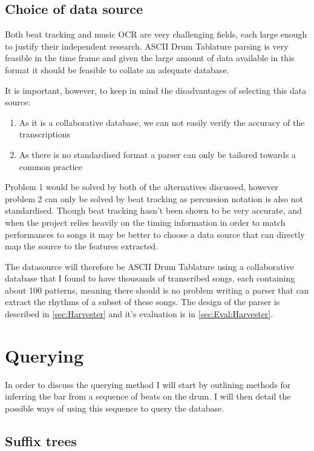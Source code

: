 \documentclass[12pt,twoside,notitlepage]{report}
\begin{document}
		\subsection{\label{subsec:ChoiceOfDataSource}Choice of data source}
		Both beat tracking and music OCR are very challenging fields, each large enough to justify their independent research. ASCII Drum Tablature parsing is very feasible in the time frame and given the large amount of data available in this format it should be feasible to collate an adequate database.
		
		It is important, however, to keep in mind the disadvantages of selecting this data source:
		\begin{enumerate}
			\item{As it is a collaborative database, we can not easily verify the accuracy of the transcriptions}
			\item{As there is no standardised format a parser can only be tailored towards a common practice}
		\end{enumerate}
		
		Problem 1 would be solved by both of the alternatives discussed, however problem 2 can only be solved by beat tracking as percussion notation is also not standardised. Though beat tracking hasn't been shown to be very accurate, and when the project relies heavily on the timing information in order to match performances to songs it may be better to choose a data source that can directly map the source to the features extracted.
		
		The datasource will therefore be ASCII Drum Tablature using a collaborative database that I found to have thousands of transcribed songs, each containing about 100 patterns, meaning there should is no problem writing a parser that can extract the rhythms of a subset of these songs. The design of the parser is described in \ref{sec:Harvester} and it's evaluation is in \ref{sec:Eval:Harvester}.		
		

	\section{Querying}
	In order to discuss the querying method I will start by outlining methods for inferring the bar from a sequence of beats on the drum. I will then detail the possible ways of using this sequence to query the database.
	

		\subsection{\label{subsec:PrepSuffix}Suffix trees}
		
\end{document}
